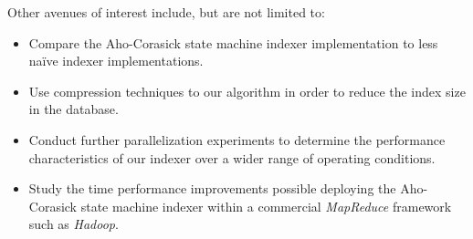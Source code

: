 \documentclass[10pt]{article}
\begin{document}
 Other avenues of interest include, but are not limited
to:

\begin{itemize}
  \item Compare the Aho-Corasick state machine indexer implementation
    to less na\"{i}ve indexer implementations.
    
    \item Use compression techniques to our algorithm in order to
      reduce the index size in the database.

      \item Conduct further parallelization experiments to determine
        the performance characteristics of our indexer over a wider
        range of operating conditions.

    \item Study the time performance improvements possible deploying
      the Aho-Corasick state machine indexer within a commercial
      \textit{MapReduce} framework such as \textit{Hadoop}.
\end{itemize}



\renewcommand\bibname{References}


\end{document}
